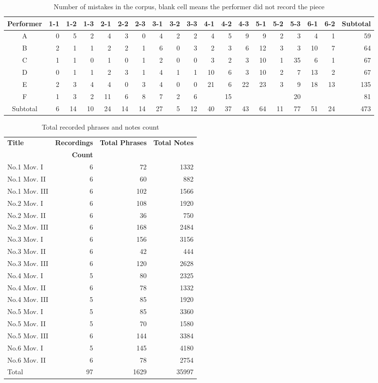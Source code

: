 \begin{table}
   \centering
   \caption{Number of mistakes in the corpus, blank cell means the performer did not record the piece}
   \label{tab:mistakes}
   \begin{tabular}{c|rrrrrrrrrrrrrrrrr|r}
      \hline
      Performer&1-1&1-2&1-3&2-1&2-2&2-3&3-1&3-2&3-3&4-1&4-2&4-3&5-1&5-2&5-3&6-1&6-2&Subtotal\\
      \hline
      A&0&5&2&4&3&0&4&2&2&4&5&9&9&2&3&4&1&59\\
      B&2&1&1&2&2&1&6&0&3&2&3&6&12&3&3&10&7&64\\
      C&1&1&0&1&0&1&2&0&0&3&2&3&10&1&35&6&1&67\\
      D&0&1&1&2&3&1&4&1&1&10&6&3&10&2&7&13&2&67\\
      E&2&3&4&4&0&3&4&0&0&21&6&22&23&3&9&18&13&135\\
      F&1&3&2&11&6&8&7&2&6&&15&&&&20&&&81\\
      \hline
      Subtotal&6&14&10&24&14&14&27&5&12&40&37&43&64&11&77&51&24&473\\
   \end{tabular}
\end{table}
\begin{table}[bp]
   \centering
   \caption{Total recorded phrases and notes count}
   \label{tab:corpuscount}
   \begin{tabular}{l|rrr}
      \hline
      \bf Title&\bf Recordings&\bf Total Phrases&\bf Total Notes\\
      &\bf Count&&\\
      \hline
      No.1 Mov. I&6&72&1332\\
      No.1 Mov. II&6&60&882\\
      No.1 Mov. III&6&102&1566\\
      No.2 Mov. I&6&108&1920\\
      No.2 Mov. II&6&36&750\\
      No.2 Mov. III&6&168&2484\\
      No.3 Mov. I&6&156&3156\\
      No.3 Mov. II&6&42&444\\
      No.3 Mov. III&6&120&2628\\
      No.4 Mov. I&5&80&2325\\
      No.4 Mov. II&6&78&1332\\
      No.4 Mov. III&5&85&1920\\
      No.5 Mov. I&5&85&3360\\
      No.5 Mov. II&5&70&1580\\
      No.5 Mov. III&6&144&3384\\
      No.6 Mov. I&5&145&4180\\
      No.6 Mov. II&6&78&2754\\
      \hline
      Total&97&1629&35997\\
      \hline
   \end{tabular}
\end{table}

